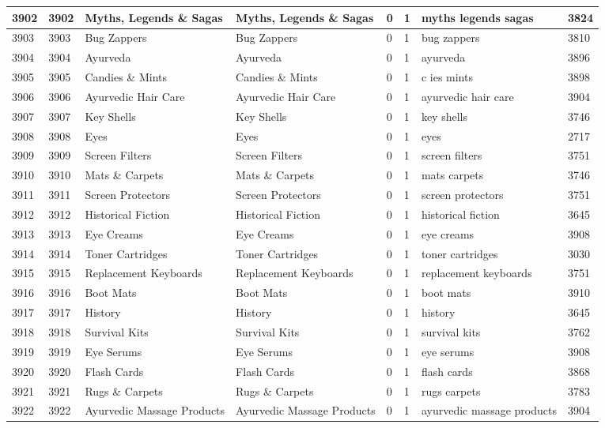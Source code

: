 \begin{longtable}{|l|l|l|l|l|l|l|l|}
3902 & 3902 & Myths, Legends \& Sagas & Myths, Legends \& Sagas & 0 & 1 & myths legends sagas & 3824 \\ \hline 
3903 & 3903 & Bug Zappers & Bug Zappers & 0 & 1 & bug zappers & 3810 \\ \hline 
3904 & 3904 & Ayurveda & Ayurveda & 0 & 1 & ayurveda & 3896 \\ \hline 
3905 & 3905 & Candies \& Mints & Candies \& Mints & 0 & 1 & c ies mints & 3898 \\ \hline 
3906 & 3906 & Ayurvedic Hair Care & Ayurvedic Hair Care & 0 & 1 & ayurvedic hair care & 3904 \\ \hline 
3907 & 3907 & Key Shells & Key Shells & 0 & 1 & key shells & 3746 \\ \hline 
3908 & 3908 & Eyes & Eyes & 0 & 1 & eyes & 2717 \\ \hline 
3909 & 3909 & Screen Filters & Screen Filters & 0 & 1 & screen filters & 3751 \\ \hline 
3910 & 3910 & Mats \& Carpets & Mats \& Carpets & 0 & 1 & mats carpets & 3746 \\ \hline 
3911 & 3911 & Screen Protectors & Screen Protectors & 0 & 1 & screen protectors & 3751 \\ \hline 
3912 & 3912 & Historical Fiction & Historical Fiction & 0 & 1 & historical fiction & 3645 \\ \hline 
3913 & 3913 & Eye Creams & Eye Creams & 0 & 1 & eye creams & 3908 \\ \hline 
3914 & 3914 & Toner Cartridges & Toner Cartridges & 0 & 1 & toner cartridges & 3030 \\ \hline 
3915 & 3915 & Replacement Keyboards & Replacement Keyboards & 0 & 1 & replacement keyboards & 3751 \\ \hline 
3916 & 3916 & Boot Mats & Boot Mats & 0 & 1 & boot mats & 3910 \\ \hline 
3917 & 3917 & History & History & 0 & 1 & history & 3645 \\ \hline 
3918 & 3918 & Survival Kits & Survival Kits & 0 & 1 & survival kits & 3762 \\ \hline 
3919 & 3919 & Eye Serums & Eye Serums & 0 & 1 & eye serums & 3908 \\ \hline 
3920 & 3920 & Flash Cards & Flash Cards & 0 & 1 & flash cards & 3868 \\ \hline 
3921 & 3921 & Rugs \& Carpets & Rugs \& Carpets & 0 & 1 & rugs carpets & 3783 \\ \hline 
3922 & 3922 & Ayurvedic Massage Products & Ayurvedic Massage Products & 0 & 1 & ayurvedic massage products & 3904 \\ \hline 

\end{longtable}
